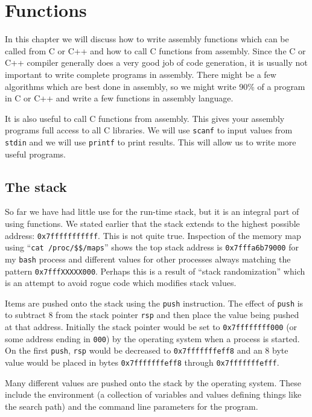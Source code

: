 \documentclass[11pt,b5paper]{book}
\begin{document}
\chapter{Functions}

In this chapter we will discuss how to write assembly functions which can be called from C or C++ 
and how to call C functions from  assembly.
Since the C or C++ compiler generally does a very good job of code generation, it is usually not
important to write complete programs in assembly.
There might be a few algorithms which are best done in assembly, so we might write 90\% of a program
in C or C++ and write a few functions in assembly language.

It is also useful to call C functions from assembly.
This gives your assembly programs full access to all C libraries.
We will use {\tt scanf} to input values from {\tt stdin} and we will use
{\tt printf} to print results.
This will allow us to write more useful programs.

\section{The stack}

So far we have had little use for the run-time stack, but it is an integral part of using functions. 
We stated earlier that the stack extends to the highest possible address: {\tt 0x7fffffffffff}.
This is not quite true.
Inspection of the memory map
using ``{\tt cat /proc/\$\$/maps}'' shows the top stack address is {\tt 0x7fffa6b79000} for my {\tt bash} process and different values for
other processes always matching the pattern {\tt 0x7fffXXXXX000}.
Perhaps this is a result of ``stack randomization'' which is an attempt
to avoid rogue code which modifies stack values.

Items are pushed onto the stack using the {\tt push} instruction. 
The effect of {\tt push} is to subtract 8 from the stack pointer {\tt rsp} and then place the value
being pushed at that address.
Initially the stack pointer would be set to {\tt 0x7ffffffff000} (or some address ending in {\tt 000}) by the operating system when a process
is started.
On the first {\tt push}, {\tt rsp} would be decreased to {\tt 0x7fffffffeff8} and an 8 byte value would be
placed in bytes {\tt 0x7fffffffeff8} through {\tt 0x7fffffffefff}.

Many different values are pushed onto the stack by the operating system.
These include the environment (a collection of variables and values defining things like the search path)
and the command line parameters for the program.
\end{document}
